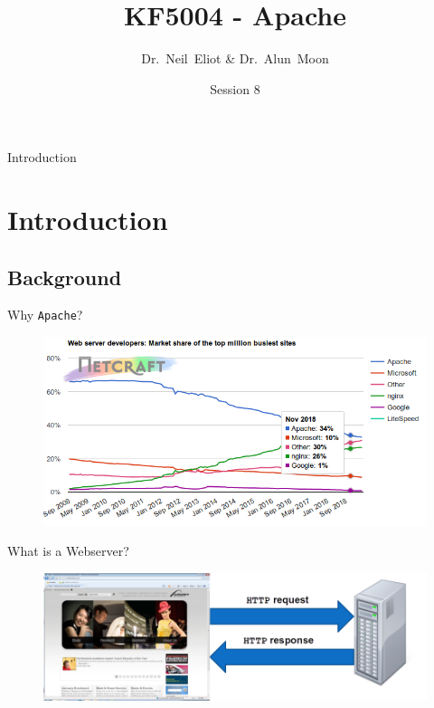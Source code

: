 \documentclass[xcolor=table]{beamer}
\title{KF5004 - Apache}
\author{Dr.~Neil~Eliot \& Dr.~Alun~Moon}
\institute[Northumbria University] %
{
  Department of Computer and Information Sciences\\
  University of Northumbria
}
\date{Session 8}
\begin{document}
\begin{frame}
  \titlepage
\end{frame}

\begin{frame}{Introduction}
  \tableofcontents
\end{frame}


\section{Introduction}
\subsection{Background}
\begin{frame}{Why \texttt{Apache}?}
    \begin{figure}
      \begin{center}
        \includegraphics[width=1\linewidth]{Market.png}
      \end{center}
    \end{figure}
\end{frame}

\begin{frame}{What is a Webserver?}
  \begin{figure}
    \begin{center}
      \includegraphics[width=1\linewidth]{What.png}
    \end{center}
  \end{figure}
\end{frame}
\end{document}
